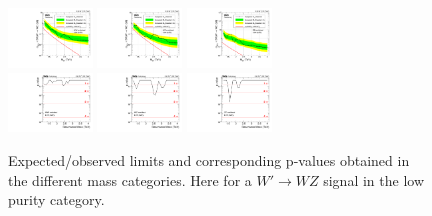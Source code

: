 \begin{figure}[h!]
\centering
\includegraphics[width=0.20\textwidth]{figures/analysis/search1/AN-15-211/limits/brazilianFlag_WZ_WWLP_13TeV_wPDF.pdf}
\includegraphics[width=0.20\textwidth]{figures/analysis/search1/AN-15-211/limits/brazilianFlag_WZ_WZLP_13TeV_wPDF.pdf}
\includegraphics[width=0.20\textwidth]{figures/analysis/search1/AN-15-211/limits/brazilianFlag_WZ_ZZLP_13TeV_wPDF.pdf}\\
\includegraphics[width=0.20\textwidth]{figures/analysis/search1/AN-15-211/pvalues/pvalue_WZinWW_low_purity.pdf}
\includegraphics[width=0.20\textwidth]{figures/analysis/search1/AN-15-211/pvalues/pvalue_WZinWZ_low_purity.pdf}
\includegraphics[width=0.20\textwidth]{figures/analysis/search1/AN-15-211/pvalues/pvalue_WZinZZ_low_purity.pdf}
\caption{Expected/observed limits and corresponding p-values obtained in the different mass categories. Here for a $W'\rightarrow WZ$ signal in the low purity category.}
\label{fig:searchI:Limits_LPWZ}
\end{figure}

